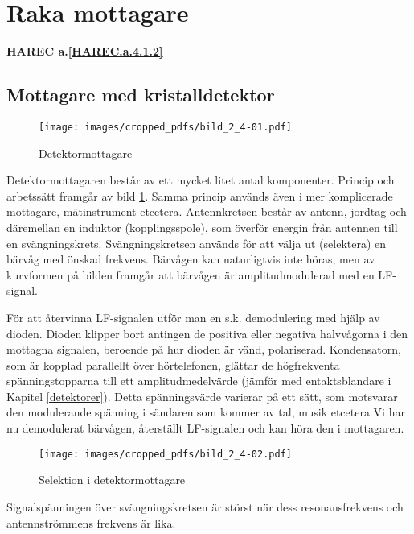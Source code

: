 \section{Raka mottagare}
\textbf{HAREC a.\ref{HAREC.a.4.1.2}\label{myHAREC.a.4.1.2}}

\subsection{Mottagare med kristalldetektor}

\begin{figure}
  \texttt{[image: images/cropped\_pdfs/bild\_2\_4-01.pdf]}
  \caption{Detektormottagare}
  \label{fig:bildII4-1}
\end{figure}

Detektormottagaren består av ett mycket litet antal komponenter.
Princip och arbetssätt framgår av bild \ref{fig:bildII4-1}.
Samma princip används även i mer komplicerade mottagare, mätinstrument etcetera.
Antennkretsen består av antenn, jordtag och däremellan en induktor
(kopplingsspole), som överför energin från antennen till en svängningskrets.
Svängningskretsen används för att välja ut (selektera)
en bärvåg med önskad frekvens.
Bärvågen kan naturligtvis inte höras, men av kurvformen på bilden framgår
att bärvågen är amplitudmodulerad med en LF-signal.

För att återvinna LF-signalen utför man en s.k. demodulering med hjälp
av dioden.
Dioden klipper bort antingen de positiva eller negativa halvvågorna i den
mottagna signalen, beroende på hur dioden är vänd, polariserad.
Kondensatorn, som är kopplad parallellt över hörtelefonen, glättar de
högfrekventa spänningstopparna till ett amplitudmedelvärde (jämför med
entaktsblandare i Kapitel \ref{detektorer}).
Detta spänningsvärde varierar på ett sätt, som motsvarar den modulerande
spänning i sändaren som kommer av tal, musik etcetera
Vi har nu demodulerat bärvågen, återställt LF-signalen och kan höra den i
mottagaren.

\begin{wrapfigure}{R}{0.5\textwidth}
  \texttt{[image: images/cropped\_pdfs/bild\_2\_4-02.pdf]}
  \caption{Selektion i detektormottagare}
  \label{fig:bildII4-2}
\end{wrapfigure}

Signalspänningen över svängningskretsen är störst när dess
resonansfrekvens och antennströmmens frekvens är lika.

